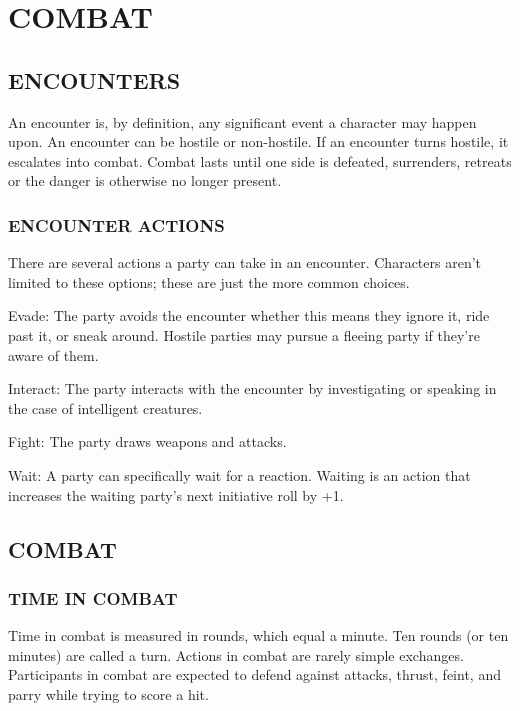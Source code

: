 \chapter{COMBAT}

\begin{multicols}{2}

\section{ENCOUNTERS}

An encounter is, by definition, any significant event a character may happen upon.  An encounter can be hostile or non-hostile.  If an encounter turns hostile, it escalates into combat.  Combat lasts until one side is defeated, surrenders, retreats or the danger is otherwise no longer present.

\subsection{ENCOUNTER ACTIONS}

There are several actions a party can take in an encounter.  Characters aren't limited to these options; these are just the more common choices.

Evade: The party avoids the encounter whether this means they ignore it, ride past it, or sneak around.  Hostile parties may pursue a fleeing party if they're aware of them.

Interact: The party interacts with the encounter by investigating or speaking in the case of intelligent creatures.

Fight: The party draws weapons and attacks.  

Wait: A party can specifically wait for a reaction.  Waiting is an action that increases the waiting party's next initiative roll by +1.  

\section{COMBAT}

\subsection{TIME IN COMBAT}

Time in combat is measured in rounds, which equal a minute.  Ten rounds (or ten minutes) are called a turn.  Actions in combat are rarely simple exchanges.  Participants in combat are expected to defend against attacks, thrust, feint, and parry while trying to score a hit.


\end{multicols}
